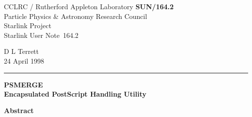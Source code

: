 \documentclass[twoside,11pt]{article}
\newcommand{\stardoccategory}  {Starlink User Note}
\newcommand{\stardocinitials}  {SUN}
\newcommand{\stardocnumber}    {164.2}
\newcommand{\stardocauthors}   {D L Terrett}
\newcommand{\stardocdate}      {24 April 1998}
\newcommand{\stardoctitle}     {PSMERGE \\[2ex]
                                Encapsulated PostScript Handling Utility}
\newcommand{\stardocversion}   {[software-version]}
\newcommand{\stardocmanual}    {[manual-type]}
\newcommand{\stardocname}{\stardocinitials /\stardocnumber}
\newenvironment{latexonly}{}{}
\begin{document}
\thispagestyle{empty}

\begin{latexonly}
   CCLRC / {\sc Rutherford Appleton Laboratory} \hfill {\bf \stardocname}\\
   {\large Particle Physics \& Astronomy Research Council}\\
   {\large Starlink Project\\}
   {\large \stardoccategory\ \stardocnumber}
   \begin{flushright}
   \stardocauthors\\
   \stardocdate
   \end{flushright}
   \vspace{-4mm}
   \rule{\textwidth}{0.5mm}
   \vspace{5mm}
   \begin{center}
   {\Huge\bf  \stardoctitle \\ [2.5ex]}
   \end{center}
   \vspace{5mm}


   \vspace{10mm}
   \begin{center}
      {\Large\bf Abstract}
   \end{center}
\end{latexonly}
\end{document}
